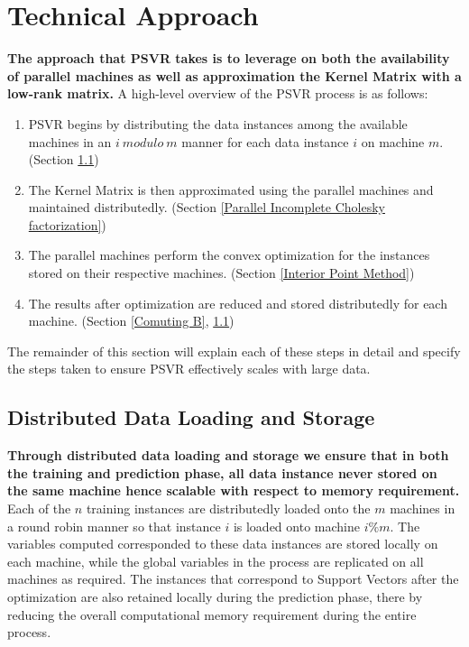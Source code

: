\documentclass[12pt]{article}
\begin{document}
 \section{Technical Approach}
 \label{Technical Approach}
{\bf The approach that PSVR takes is to leverage on both the availability of parallel machines as well as approximation the Kernel Matrix with a low-rank matrix.}
\newline\newline
A high-level overview of the PSVR process is as follows:
\begin{enumerate}
\item PSVR begins by distributing the data instances among the available machines in an $i\ modulo\ m$ manner for each data instance $i$ on machine $m$. (Section \ref{Distributed Data Loading and Storage})
\item The Kernel Matrix is then approximated using the parallel machines and maintained distributedly. (Section \ref{Parallel Incomplete Cholesky factorization})
\item The parallel machines perform the convex optimization for the instances stored on their respective machines. (Section \ref{Interior Point Method})
\item The results after optimization are reduced and stored distributedly for each machine. (Section \ref{Comuting B},  \ref{Distributed Data Loading and Storage})
\end{enumerate}
 The remainder of this section will explain each of these steps in detail and specify the steps taken to ensure PSVR effectively scales with large data.
 \subsection{Distributed Data Loading and Storage}
 \label{Distributed Data Loading and Storage}
  {\bf Through distributed data loading and storage we ensure that in both the training and prediction phase, all data instance never stored on the same machine hence scalable with respect to memory requirement.}
  \newline\newline
 Each of the $n$ training instances are distributedly loaded onto the $m$ machines in a round robin manner so that instance $i$ is loaded onto machine $i\%m$. The variables computed corresponded to these data instances are stored locally on each machine, while the global variables in the process are replicated on all machines as required. The instances that correspond to Support Vectors after the optimization are also retained locally during the prediction phase, there by reducing the overall computational memory requirement during the entire process.
\end{document}

